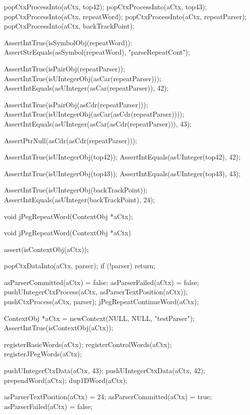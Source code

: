   popCtxProcessInto(aCtx, top42);
  popCtxProcessInto(aCtx, top43);
  popCtxProcessInto(aCtx, repeatWord);
  popCtxProcessInto(aCtx, repeatParser);
  popCtxProcessInto(aCtx, backTrackPoint);
  
  AssertIntTrue(isSymbolObj(repeatWord));
  AssertStrEquals(asSymbol(repeatWord), "parseRepeatCont");
  
  AssertIntTrue(isPairObj(repeatParser));
  AssertIntTrue(isUIntegerObj(asCar(repeatParser)));
  AssertIntEquals(asUInteger(asCar(repeatParser)), 42);
  
  AssertIntTrue(isPairObj(asCdr(repeatParser)));
  AssertIntTrue(isUIntegerObj(asCar(asCdr(repeatParser))));
  AssertIntEquals(asUInteger(asCar(asCdr(repeatParser))), 43);
  
  AssertPtrNull(asCdr(asCdr(repeatParser)));
  
  AssertIntTrue(isUIntegerObj(top42));
  AssertIntEquals(asUInteger(top42), 42);  

  AssertIntTrue(isUIntegerObj(top43));
  AssertIntEquals(asUInteger(top43), 43);
  
  AssertIntTrue(isUIntegerObj(backTrackPoint));
  AssertIntEquals(asUInteger(backTrackPoint), 24);
\stopCTest
\stopTestCase
\stopTestSuite

\startTestSuite[jPegRepeatWord]

\startCHeader
void jPegRepeatWord(ContextObj *aCtx);
\stopCHeader

\startCCode
void jPegRepeatWord(ContextObj *aCtx) {
  assert(isContextObj(aCtx));
  
  popCtxDataInto(aCtx, parser);
  if (!parser) return; 
  
  asParserCommitted(aCtx) = false;
  asParserFailed(aCtx)    = false;
  pushUIntegerCtxProcess(aCtx, asParserTextPosition(aCtx));
  pushCtxProcess(aCtx, parser);
  jPegRepeatContinueWord(aCtx);
}
\stopCCode


\startCTest
  ContextObj *aCtx = newContext(NULL, NULL, "testParser");
  AssertIntTrue(isContextObj(aCtx));
  
  registerBasicWords(aCtx);
  registerControlWords(aCtx);
  registerJPegWords(aCtx);
  
  pushUIntegerCtxData(aCtx, 43);
  pushUIntegerCtxData(aCtx, 42);
  prependWord(aCtx);
  dup1DWord(aCtx);
  
  asParserTextPosition(aCtx) = 24;
  asParserCommitted(aCtx)    = true;
  asParserFailed(aCtx)       = false;
  
